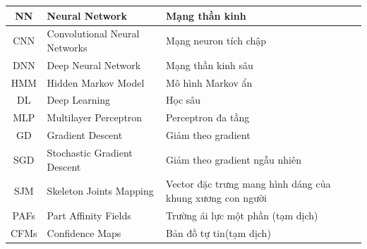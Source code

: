 \newpage
{}
\listoffigures


\newpage
{}
\listoftables


\newpage
\thispagestyle{danhmucviettat}
{}



\FloatBarrier
\begin{table}[h]
\label{table:bo_cuc_luan_van}
\centering
\begin{center}
\begin{tabular}{|c|l|p{7cm}|} 
\hline 
NN & Neural Network & Mạng thần kinh\\ 
\hline
CNN & Convolutional Neural Networks & Mạng neuron tích chập\\
\hline 
DNN & Deep Neural Network & Mạng thần kinh sâu\\
\hline
HMM & Hidden Markov Model & Mô hình Markov ẩn \\
\hline 
DL & Deep Learning & Học sâu\\
\hline
MLP & Multilayer Perceptron & Perceptron đa tầng\\
\hline
GD & Gradient Descent & Giảm theo gradient\\
\hline
SGD & Stochastic Gradient Descent & Giảm theo gradient ngẫu nhiên\\
\hline
SJM & Skeleton Joints Mapping & Vector đặc trưng mang hình dáng của khung xương con người\\
\hline
PAFs & Part Affinity Fields &  Trường ái lực một phần (tạm dịch)\\
\hline
CFMs & Confidence Maps & Bản đồ tự tin(tạm dịch)\\
\hline
\end{tabular}
\end{center}
\end{table}
\FloatBarrier
 
